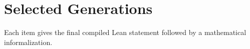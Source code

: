\providecommand{\genexheading}{\section}
\genexheading{Selected Generations}
\label{app:generated-examples}

Each item gives the final compiled Lean statement followed by a mathematical
informalization. 

